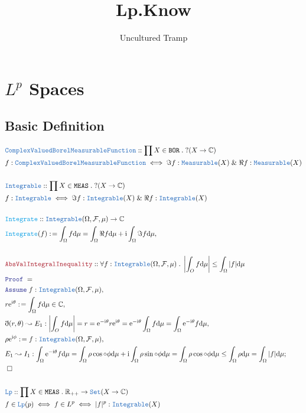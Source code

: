 \documentclass[12pt]{article}
\author{Uncultured Tramp}
\title{Lp.Know}
\newcommand{\TYPE}[1]{\textcolor{NavyBlue}{\mathtt{#1}}}
\newcommand{\FUNC}[1]{\textcolor{Cerulean}{\mathtt{#1}}}
\newcommand{\LOGIC}[1]{\textcolor{Blue}{\mathtt{#1}}}
\newcommand{\THM}[1]{\textcolor{Maroon}{\mathtt{#1}}}
\renewcommand{\.}{\; . \;}
\newcommand{\de}{: \kern 0.1pc =}
\newcommand{\Reals}{\mathbb{R} }
\newcommand{\Co}{\mathbb{C} }
\newcommand{\Set}{\TYPE{Set}}
\renewcommand{\And}{\; \& \;}
\newcommand{\A}{\LOGIC{Assume} \;}
\newcommand{\QED}{\; \square}
\newcommand{\ByDef}{\eth}
\newcommand{\Proof}{\LOGIC{Proof} \; }
\newcommand{\F}{\mathcal{F}}
\renewcommand{\O}{\Omega}
\newcommand{\CVBMF}{\TYPE{ComplexValuedBorelMeasurableFunction}}
\newcommand{\Integrable}{\TYPE{Integrable}}
\begin{document}
\maketitle
\tableofcontents
\section{$L^p$ Spaces}
\subsection{Basic Definition}
\begin{align*}
& \CVBMF :: \prod X \in \mathtt{BOR} \. ?(X \to  \Co )  \\
& f : \CVBMF \iff \Im f : \TYPE{Measurable}(X) \And \Re f : \TYPE{Measurable}(X)
\\ \\
& \Integrable :: \prod X \in \mathtt{MEAS} \. ?(X \to  \Co )  \\
& f : \Integrable \iff \Im f : \TYPE{Integrable}(X) \And \Re f : \TYPE{Integrable}(X)
\\ \\
& \FUNC{Integrate} :: \Integrable(\O,\F,\mu) \to \Co \\
& \FUNC{Integrate}(f) \de \int_\O f \mathrm{d}\mu = \int_\O \Re f \mathrm{d} \mu + \mathrm{i} \int_\O \Im f \mathrm{d}\mu,
\\ \\
&  \THM{AbsValIntegralInequality} :: \forall f : \Integrable(\O,\F,\mu) \. \left |\int_O f \mathrm{d}\mu \right | \le \int_\O |f|\mathrm{d}\mu \\
&  \Proof =  \\
&   \A f : \Integrable(\O,\F,\mu),      \\
&  r\mathrm{e}^{\mathrm{i}\theta} \de \int_\O f \mathrm{d}\mu \in \Co, \\
&  \ByDef (r, \theta) \leadsto E_1 : \left  |\int_O f \mathrm{d}\mu \right |  = r =  \mathrm{e}^{-\mathrm{i}\theta}r\mathrm{e}^{\mathrm{i}\theta}  =  \mathrm{e}^{-\mathrm{i}\theta}\int_\O f \mathrm{d}\mu  = \int_\O \mathrm{e}^{-\mathrm{i}\theta}f\mathrm{d}\mu, \\
& \rho\mathrm{e}^{\mathrm{i}\phi} \de f : \Integrable(\O,\F,\mu),\\
& E_1  \leadsto I_1 : \int_\O \mathrm{e}^{-\mathrm{i}\theta}f\mathrm{d}\mu = \int_\O \rho \cos \circ \phi \mathrm{d}\mu + \mathrm{i} \int_\O \rho \sin \circ \phi \mathrm{d}\mu = 
\int_\O \rho \cos \circ \phi \mathrm{d}\mu  \le \int_\O \rho \mathrm{d}\mu = \int_\O |f|\mathrm d \mu ; \\
& \QED
\\ \\
& \TYPE{Lp} :: \prod X \in \mathtt{MEAS} \. \Reals_{++} \to \Set(X \to \Co)\\
& f \in \TYPE{Lp}(p) \iff f \in L^p \iff |f|^p : \Integrable(X) 
\end{align*}
\newpage
\end{document}
